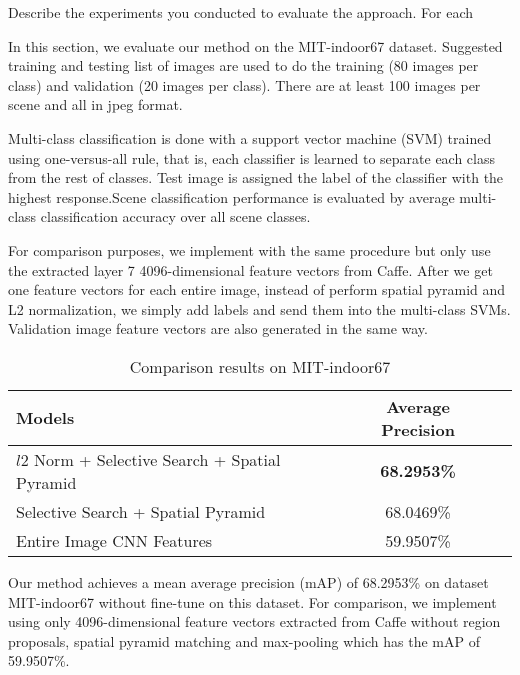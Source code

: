 Describe the experiments you conducted to evaluate the approach.  For each

In this section, we evaluate our method on the MIT-indoor67 dataset. Suggested training and
testing list of images are used to do the training (80 images per class)
and validation (20 images per class). There are at least 100 images per
scene and all in jpeg format.

Multi-class classification is done with a support vector machine (SVM) trained
using one-versus-all rule, that is, each classifier is learned to separate each
class from the rest of classes. Test image is assigned the label of the
classifier with the highest response.Scene classification performance is
evaluated by average multi-class classification accuracy over all scene classes.

For comparison purposes, we implement with the same procedure but only use
the extracted layer 7 4096-dimensional feature vectors from Caffe. After we get
one feature vectors for each entire image, instead of perform spatial pyramid
and L2 normalization, we simply add labels and send them into the multi-class
SVMs. Validation image feature vectors are also generated in the same way.

\begin{table*}[ht]
	\caption{Comparison results on MIT-indoor67}
	\centering
	\begin{tabular}{l c c}
	\hline \hline
	Models                & Average Precision \\ \hline
	$l2$ Norm + Selective Search + Spatial Pyramid & {\bf{68.2953\%}} \\
	Selective Search + Spatial Pyramid & 68.0469\% \\
        Entire Image CNN Features & 59.9507\% \\
	\hline
	\end{tabular}
	\label{tab:overall}
\end{table*}

Our
method achieves a mean average precision (mAP) of 68.2953\% on dataset
MIT-indoor67\cite{Quattoni:2009:RIS} without fine-tune on this dataset.
For comparison, we implement using only 4096-dimensional feature vectors
extracted from Caffe without region proposals, spatial pyramid matching 
and max-pooling which has the mAP of 59.9507\%.

